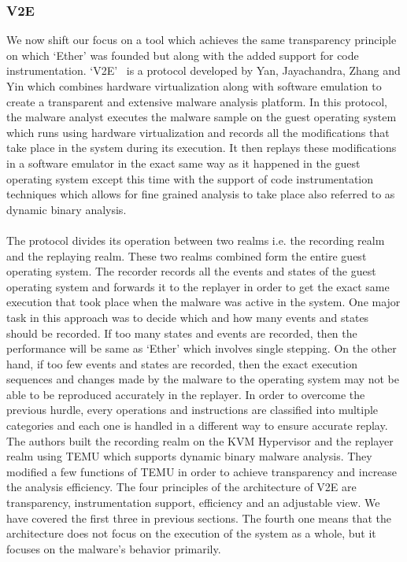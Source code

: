 \documentclass[11pt]{article}
\begin{document}
	\subsubsection{V2E}
	We now shift our focus on a tool which achieves the same transparency principle on which ‘Ether’ was founded but along with the added support for code instrumentation. ‘V2E’~\cite{yan2012v2e} is a protocol developed by Yan, Jayachandra, Zhang and Yin which combines hardware virtualization along with software emulation to create a transparent and extensive malware analysis platform. In this protocol, the malware analyst executes the malware sample on the guest operating system which runs using hardware virtualization and records all the modifications that take place in the system during its execution. It then replays these modifications in a software emulator in the exact same way as it happened in the guest operating system except this time with the support of code instrumentation techniques which allows for fine grained analysis to take place also referred to as dynamic binary analysis.\\ \\
	The protocol divides its operation between two realms i.e. the recording realm and the replaying realm. These two realms combined form the entire guest operating system. The recorder records all the events and states of the guest operating system and forwards it to the replayer in order to get the exact same execution that took place when the malware was active in the system. One major task in this approach was to decide which and how many events and states should be recorded. If too many states and events are recorded, then the performance will be same as ‘Ether’ which involves single stepping. On the other hand, if too few events and states are recorded, then the exact execution sequences and changes made by the malware to the operating system may not be able to be reproduced accurately in the replayer. In order to overcome the previous hurdle, every operations and instructions are classified into multiple categories and each one is handled in a different way to ensure accurate replay. The authors built the recording realm on the KVM Hypervisor and the replayer realm using TEMU which supports dynamic binary malware analysis. They modified a few functions of TEMU in order to achieve transparency and increase the analysis efficiency. The four principles of the architecture of V2E are transparency, instrumentation support, efficiency and an adjustable view. We have covered the first three in previous sections. The fourth one means that the architecture does not focus on the execution of the system as a whole, but it focuses on the malware’s behavior primarily.\\ \\
\end{document}
